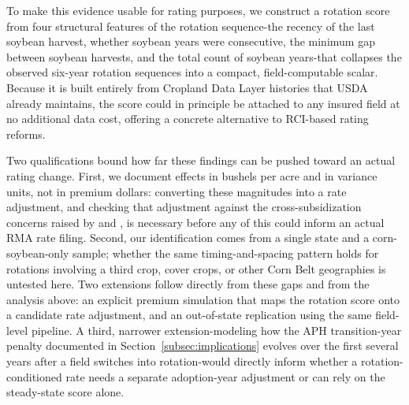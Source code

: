 \documentclass[12pt,letterpaper]{article}
\theoremstyle{remark}
\theoremstyle{remark}
\theoremstyle{plain}
\theoremstyle{definition}
\begin{document}
To make this evidence usable for rating purposes, we construct a rotation score from four structural features of the rotation sequence-the recency of the last soybean harvest, whether soybean years were consecutive, the minimum gap between soybean harvests, and the total count of soybean years-that collapses the observed six-year rotation sequences into a compact, field-computable scalar. Because it is built entirely from Cropland Data Layer histories that USDA already maintains, the score could in principle be attached to any insured field at no additional data cost, offering a concrete alternative to RCI-based rating reforms.

Two qualifications bound how far these findings can be pushed toward an actual rating change. First, we document effects in bushels per acre and in variance units, not in premium dollars: converting these magnitudes into a rate adjustment, and checking that adjustment against the cross-subsidization concerns raised by \citet{Ramaswami1993} and \citet{Babcock1996}, is necessary before any of this could inform an actual RMA rate filing. Second, our identification comes from a single state and a corn-soybean-only sample; whether the same timing-and-spacing pattern holds for rotations involving a third crop, cover crops, or other Corn Belt geographies is untested here. Two extensions follow directly from these gaps and from the analysis above: an explicit premium simulation that maps the rotation score onto a candidate rate adjustment, and an out-of-state replication using the same field-level pipeline. A third, narrower extension-modeling how the APH transition-year penalty documented in Section~\ref{subsec:implications} evolves over the first several years after a field switches into rotation-would directly inform whether a rotation-conditioned rate needs a separate adoption-year adjustment or can rely on the steady-state score alone.
\end{document}

